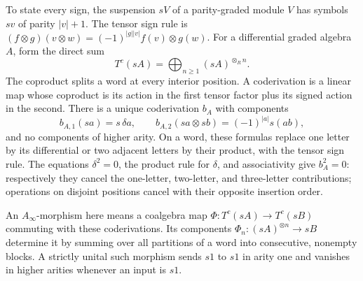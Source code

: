 To state every sign, the suspension \(sV\) of a parity-graded
module \(V\) has symbols \(sv\) of parity \(|v|+1\).
The tensor sign rule is
\((f\otimes g)(v\otimes w)=(-1)^{|g||v|}f(v)\otimes g(w)\).
For a differential graded algebra \(A\), form the direct sum
\[
 T^c(sA)=\bigoplus_{n\geq1}(sA)^{\otimes_R n}.
\]
The coproduct splits a word at every interior position. A
coderivation is a linear map whose coproduct is its action in
the first tensor factor plus its signed action in the second.
There is a unique coderivation \(b_A\) with components
\[
 b_{A,1}(sa)=s\,\delta a,\qquad
 b_{A,2}(sa\otimes sb)=(-1)^{|a|}s(ab),
\]
and no components of higher arity. On a word, these formulas
replace one letter by its differential or two adjacent letters
by their product, with the tensor sign rule.
The equations \(\delta^2=0\), the product rule for \(\delta\),
and associativity give \(b_A^2=0\): respectively they cancel
the one-letter, two-letter, and three-letter contributions;
operations on disjoint positions cancel with their opposite
insertion order.

An \(A_\infty\)-morphism here means a coalgebra map
\(\Phi:T^c(sA)\to T^c(sB)\) commuting with these coderivations.
Its components \(\Phi_n:(sA)^{\otimes n}\to sB\) determine
it by summing over all partitions of a word into consecutive,
nonempty blocks. A strictly unital such morphism sends \(s1\)
to \(s1\) in arity one and vanishes in higher arities whenever
an input is \(s1\).


